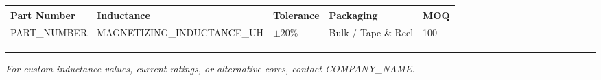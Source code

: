 \documentclass[10pt,a4paper]{article}
\begin{document}
\vspace{8mm}

\noindent{\large\bfseries\textcolor{headerblue}{Ordering Information}}
\vspace{2mm}

{\footnotesize
\begin{tabular}{|l|l|l|l|l|}
\hline
\rowcolor{lightblue}
\textbf{Part Number} & \textbf{Inductance} & \textbf{Tolerance} & \textbf{Packaging} & \textbf{MOQ} \\
\hline
{{PART_NUMBER}} & {{MAGNETIZING_INDUCTANCE_UH}} & $\pm$20\% & Bulk / Tape \& Reel & 100 \\
\hline
\end{tabular}
}

\vspace{5mm}
\hrule
\vspace{2mm}
{\footnotesize\textit{For custom inductance values, current ratings, or alternative cores, contact {{COMPANY_NAME}}.}}
\end{document}
